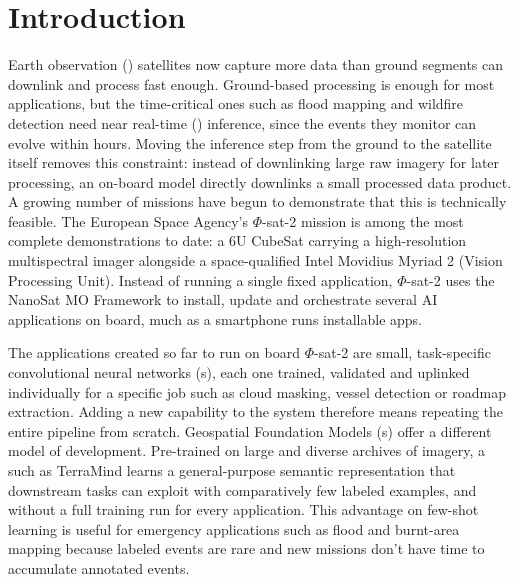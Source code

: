 \chapter{Introduction}
\label{chap:introduction}

Earth observation () satellites now capture more data than ground segments can downlink and process fast enough\cite{barretta2026onboardaireview}.
Ground-based processing is enough for most applications, but the time-critical ones such as flood mapping\cite{tellman2021satellite} and wildfire detection\cite{taylor2013wildfire} need near real-time () inference, since the events they monitor can evolve within hours.
Moving the inference step from the ground to the satellite itself removes this constraint: instead of downlinking large raw imagery for later processing, an on-board model directly downlinks a small processed data product.
A growing number of missions have begun to demonstrate that this is technically feasible\cite{barretta2026onboardaireview}.
The European Space Agency's $\Phi$-sat-2 mission is among the most complete demonstrations to date: a 6U CubeSat carrying a high-resolution multispectral imager alongside a space-qualified Intel Movidius Myriad 2  (Vision Processing Unit)\cite{myriad2}.
Instead of running a single fixed application, $\Phi$-sat-2 uses the NanoSat MO Framework\cite{coelho2021phisat2} to install, update and orchestrate several AI applications on board, much as a smartphone runs installable apps.

The applications created so far to run on board $\Phi$-sat-2 are small, task-specific convolutional neural networks (s), each one trained, validated and uplinked individually for a specific job such as cloud masking, vessel detection or roadmap extraction\cite{marin2021phi}.
Adding a new capability to the system therefore means repeating the entire pipeline from scratch.
Geospatial Foundation Models (s) offer a different model of development.
Pre-trained on large and diverse archives of  imagery, a  such as TerraMind\cite{jakubik2025terramind} learns a general-purpose semantic representation that downstream tasks can exploit with comparatively few labeled examples, and without a full training run for every application.
This advantage on few-shot learning is useful for emergency applications such as flood and burnt-area mapping because labeled events are rare and new missions don't have time to accumulate annotated events.

